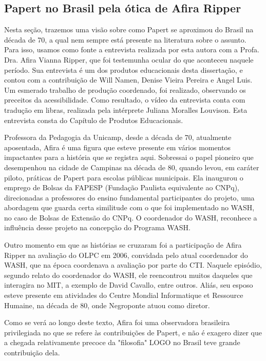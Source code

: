 \subsection[Papert no Brasil pela ótica de Afira Ripper]{Papert no Brasil pela ótica de Afira Ripper}\label{Papert no Brasil pela ótica de Afira Ripper}
Nesta seção, trazemos uma visão sobre como Papert se aproximou do Brasil na década de 70, a qual nem sempre está presente na literatura sobre o assunto. Para isso, usamos como fonte a entrevista realizada por esta autora com a Profa. Dra. Afira Vianna Ripper, que foi testemunha ocular do que aconteceu naquele período. Sua entrevista é um dos produtos educacionais desta dissertação, e contou com a contribuição de Will Namen, Denise Vieira Pereira e Angel Luis. Um esmerado trabalho de produção coordenado, foi realizado, observando os preceitos da acessibilidade. Como resultado, o vídeo da entrevista conta com tradução em libras, realizada pela intérprete Juliana Moralles Louvison. Esta entrevista consta do Capítulo de Produtos Educacionais.

Professora da Pedagogia da Unicamp, desde a década de 70, atualmente aposentada, Afira é uma figura que esteve presente em vários momentos impactantes para a história que se registra aqui. Sobressai o papel pioneiro que  desempenhou na cidade de Campinas na década de 80, quando levou, em caráter piloto, práticas de Papert para escolas públicas municipais. Ela inaugurou o emprego de Bolsas da FAPESP (Fundação Paulista equivalente ao CNPq), direcionadas a professores do ensino fundamental participantes do projeto, uma abordagem que guarda certa similitude com o que foi implementado no WASH, no caso de Bolsas de Extensão do CNPq. O coordenador do WASH, reconhece a influência desse projeto na concepção do Programa WASH.

Outro momento em que as histórias se cruzaram foi a participação de Afira Ripper na avaliação do OLPC em 2006, convidada pelo atual coordenador do WASH, que na época coordenava a avaliação por parte do CTI. Naquele episódio, segundo relato do coordenador do WASH, ele reencontrou muitos daqueles que interagira no MIT, a exemplo de David Cavallo, entre outros. Aliás, seu esposo esteve presente em atividades do Centre Mondial Informatique et Ressource Humaine, na década de 80, onde Negroponte atuou como diretor.

Como se verá ao longo deste texto, Afira foi uma observadora brasileira privilegiada no que se refere às contribuições de Papert, e não é exagero dizer que a chegada relativamente precoce da "filosofia" LOGO no Brasil teve grande contribuição dela.


